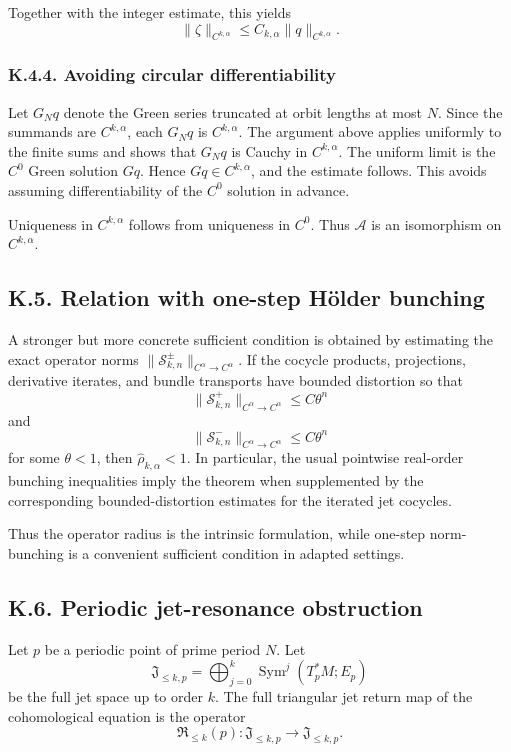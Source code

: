\documentclass[12pt,a4paper]{article}
\theoremstyle{plain}
\numberwithin{equation}{section}
\numberwithin{theorem}{section}
\begin{document}
Together with the integer estimate, this yields
\[
\|\zeta\|_{C^{k,\alpha}}
\le
C_{k,\alpha}\|q\|_{C^{k,\alpha}}.
\]

\subsubsection{K.4.4. Avoiding circular differentiability}

Let $G_Nq$ denote the Green series truncated at orbit lengths at most $N$. Since the summands are $C^{k,\alpha}$, each $G_Nq$ is $C^{k,\alpha}$. The argument above applies uniformly to the finite sums and shows that $G_Nq$ is Cauchy in $C^{k,\alpha}$. The uniform limit is the $C^0$ Green solution $Gq$. Hence $Gq\in C^{k,\alpha}$, and the estimate follows. This avoids assuming differentiability of the $C^0$ solution in advance.

Uniqueness in $C^{k,\alpha}$ follows from uniqueness in $C^0$. Thus $\mathcal A$ is an isomorphism on $C^{k,\alpha}$.

\subsection{K.5. Relation with one-step H\"older bunching}

A stronger but more concrete sufficient condition is obtained by estimating the exact operator norms $\|\mathcal S_{k,n}^\pm\|_{C^\alpha\to C^\alpha}$. If the cocycle products, projections, derivative iterates, and bundle transports have bounded distortion so that
\[
\|\mathcal S_{k,n}^+\|_{C^\alpha\to C^\alpha}
\le
C\theta^n
\]
and
\[
\|\mathcal S_{k,n}^-\|_{C^\alpha\to C^\alpha}
\le
C\theta^n
\]
for some $\theta<1$, then $\widehat\rho_{k,\alpha}<1$. In particular, the usual pointwise real-order bunching inequalities imply the theorem when supplemented by the corresponding bounded-distortion estimates for the iterated jet cocycles.

Thus the operator radius is the intrinsic formulation, while one-step norm-bunching is a convenient sufficient condition in adapted settings.

\subsection{K.6. Periodic jet-resonance obstruction}

Let $p$ be a periodic point of prime period $N$. Let
\[
\mathfrak J_{\le k,p}
=
\bigoplus_{j=0}^{k}
\operatorname{Sym}^j(T_p^*M;E_p)
\]
be the full jet space up to order $k$. The full triangular jet return map of the cohomological equation is the operator
\[
\mathfrak R_{\le k}(p):
\mathfrak J_{\le k,p}
\to
\mathfrak J_{\le k,p}.
\]
\end{document}
